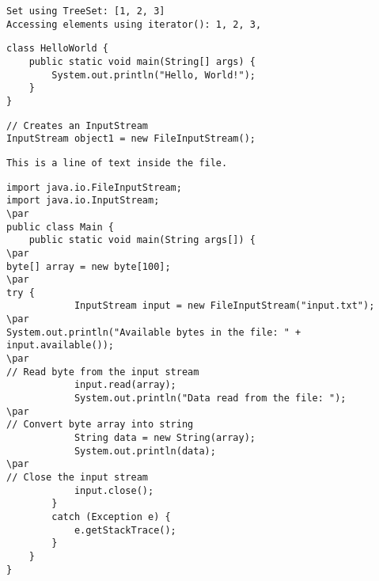 \documentclass{book}
\def\lthtmlcheckvsize{\ifdim\ht\sizebox<\vsize 
  \ifdim\wd\sizebox<\hsize\expandafter\hfill\fi \expandafter\vfill
  \else\expandafter\vss\fi}%
\begin{document}
{\newpage\clearpage
{}%
\begin{lstlisting}
Set using TreeSet: [1, 2, 3]
Accessing elements using iterator(): 1, 2, 3,
\end{lstlisting}%
\lthtmlfigureZ
\lthtmlcheckvsize\clearpage}

{\newpage\clearpage
{}%
\begin{lstlisting}
class HelloWorld {
    public static void main(String[] args) {
        System.out.println("Hello, World!"); 
    }
}
\end{lstlisting}%
\lthtmlfigureZ
\lthtmlcheckvsize\clearpage}

{\newpage\clearpage
{}%
\begin{lstlisting}
// Creates an InputStream
InputStream object1 = new FileInputStream();
\end{lstlisting}%
\lthtmlfigureZ
\lthtmlcheckvsize\clearpage}

{\newpage\clearpage
{}%
\begin{lstlisting}
This is a line of text inside the file.
\end{lstlisting}%
\lthtmlfigureZ
\lthtmlcheckvsize\clearpage}

{\newpage\clearpage
{}%
\begin{lstlisting}
import java.io.FileInputStream;
import java.io.InputStream;
\par
public class Main {
    public static void main(String args[]) {
\par
byte[] array = new byte[100];
\par
try {
            InputStream input = new FileInputStream("input.txt");
\par
System.out.println("Available bytes in the file: " + input.available());
\par
// Read byte from the input stream
            input.read(array);
            System.out.println("Data read from the file: ");
\par
// Convert byte array into string
            String data = new String(array);
            System.out.println(data);
\par
// Close the input stream
            input.close();
        }
        catch (Exception e) {
            e.getStackTrace();
        }
    }
}
\end{lstlisting}%
\lthtmlfigureZ
\lthtmlcheckvsize\clearpage}
\end{document}
